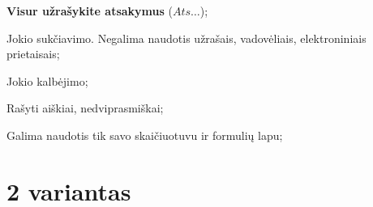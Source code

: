 \documentclass[a4paper]{article}
\begin{document}
\begin{small}
      \begin{enumerate*}[label={(\arabic*)}]
            \item \textbf{Visur užrašykite atsakymus} ($Ats\ldots$);
            \item Jokio sukčiavimo. Negalima naudotis užrašais, vadovėliais,
            elektroniniais prietaisais;
            \item Jokio kalbėjimo;
            \item Rašyti aiškiai, nedviprasmiškai;
            \item Galima naudotis tik savo skaičiuotuvu ir formulių lapu;
      \end{enumerate*}
\end{small}
\bigskip

\section*{2 variantas}
\end{document}
